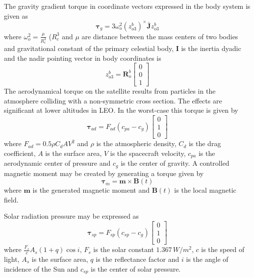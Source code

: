 The gravity gradient torque in coordinate vectors expressed in the body system is given as
\begin{equation}
    \boldsymbol{\tau}_g=3\omega_o^2(z_{o3}^b)^{\times}\bar{\mathbf{J}}z_{o3}^b
\end{equation}
\noindent where $\omega_o^2=\frac{\mu}{R_c^3}$ ($R_c^3$ and $\mu$ are distance between the mass centers of two bodies and gravitational constant of the primary celestial body, $\mathbf{I}$ is the inertia dyadic and the nadir pointing vector in body coordinates is
\begin{equation}
    z_{o3}^b=\mathbf{R}_o^b\begin{bmatrix}
    0 \\
    0 \\
    1 
    \end{bmatrix}
\end{equation}
The aerodynamical torque on the satellite results from particles in the atmosphere colliding
with a non-symmetric cross section. The effects are significant at lower altitudes in LEO. In the
worst-case this torque is given by
\begin{equation}
    \boldsymbol{\tau}_{ad}=F_{ad}(c_{pa}-c_{g})\begin{bmatrix}
    0 \\
    1 \\
    0 
    \end{bmatrix}
\end{equation}
\noindent where $F_{ad}=0.5\rho C_d AV^2$ and $\rho$ is the atmospheric density, $C_d$ is the drag coefficient, $A$ is the surface area, $V$ is the spacecraft velocity, $c_{pa}$ is the aerodynamic center of pressure and $c_g$ is the center of gravity.
A controlled magnetic moment may be created by generating a torque given by
\begin{equation}
    \boldsymbol{\tau}_{m}=\mathbf{m}\times \mathbf{B}(t)
\end{equation}
\noindent where $\mathbf{m}$ is the generated magnetic moment and $\mathbf{B}(t)$ is the local magnetic field.

Solar radiation pressure may be expressed as 
\begin{equation}
    \boldsymbol{\tau}_{sp}=F_{sp}(c_{sp}-c_{g})\begin{bmatrix}
    0 \\
    1 \\
    0 
    \end{bmatrix}
\end{equation}
\noindent where $\frac{F_s}{c}A_s(1+q)\cos i$, $F_s$ is the solar constant $1.367\hspace{2pt} W/m^2$, $c$ is the speed of light, $A_s$ is the surface area, $q$ is the reflectance factor and $i$ is the angle of incidence of the Sun and $c_{sp}$ is the center of solar pressure.

